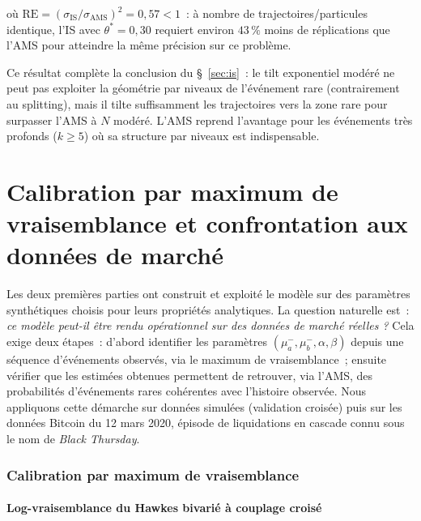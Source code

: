 \documentclass[11pt,a4paper]{article}
\theoremstyle{definition}
\begin{document}
\noindent où $\mathrm{RE}=(\sigma_\mathrm{IS}/\sigma_\mathrm{AMS})^2=0{,}57 < 1$~: à nombre
de trajectoires/particules identique, l'IS avec $\theta^*=0{,}30$ requiert environ
$43\,\%$ moins de réplications que l'AMS pour atteindre la même précision sur ce problème.

Ce résultat complète la conclusion du §~\ref{sec:is}~: le tilt exponentiel modéré
ne peut pas exploiter la géométrie par niveaux de l'événement rare (contrairement
au splitting), mais il tilte suffisamment les trajectoires vers la zone rare pour
surpasser l'AMS à $N$ modéré. L'AMS reprend l'avantage pour les événements très
profonds ($k\ge5$) où sa structure par niveaux est indispensable.

\bigskip
\part{Calibration par maximum de vraisemblance et confrontation aux données de marché}

Les deux premières parties ont construit et exploité le modèle sur des
paramètres synthétiques choisis pour leurs propriétés analytiques. La
question naturelle est~: \emph{ce modèle peut-il être rendu opérationnel
sur des données de marché réelles ?} Cela exige deux étapes~: d'abord
identifier les paramètres $(\mu_a^-,\mu_b^-,\alpha,\beta)$ depuis une
séquence d'événements observés, via le maximum de vraisemblance~; ensuite
vérifier que les estimées obtenues permettent de retrouver, via l'AMS,
des probabilités d'événements rares cohérentes avec l'histoire observée.
Nous appliquons cette démarche sur données simulées (validation croisée)
puis sur les données Bitcoin du 12 mars 2020, épisode de liquidations en
cascade connu sous le nom de \emph{Black Thursday}.

\section{Calibration par maximum de vraisemblance}
\label{sec:mle}

\subsection{Log-vraisemblance du Hawkes bivarié à couplage croisé}
\end{document}
